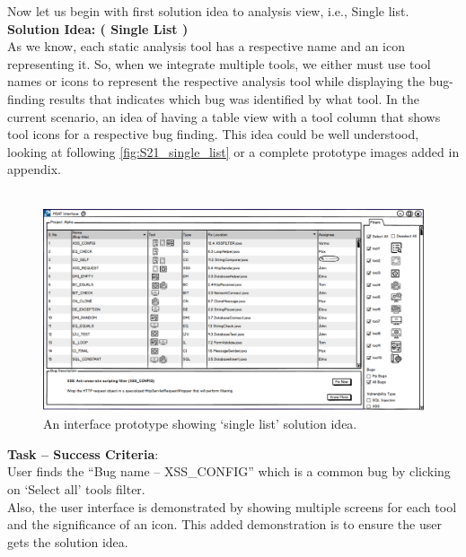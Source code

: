 Now let us begin with first solution idea to analysis view, i.e., Single list. \\

\textbf{Solution Idea: ( Single List )} \\

As we know, each static analysis tool has a respective name and an icon representing it. So, when we integrate multiple tools, we either must use tool names or icons to represent the respective analysis tool while displaying the bug-finding results that indicates which bug was identified by what tool. In the current scenario, an idea of having a table view with a tool column that shows tool icons for a respective bug finding. This idea could be well understood, looking at following  \autoref{fig:S21_single_list} or a complete prototype images added in appendix. \\ \\


\begin{figure}[hbt!]
	\centering
	\includegraphics[width=\linewidth]{figures/solution_ideas_snaps/S21_single_list}
	\caption{An interface prototype showing ‘single list’ solution idea.}
	\label{fig:S21_single_list}
\end{figure} 

\textbf{Task – Success Criteria}: \\

User finds the “Bug name – XSS\_CONFIG” which is a common bug by clicking on ‘Select all’ tools filter. \\

Also, the user interface is demonstrated by showing multiple screens for each tool and the significance of an icon. This added demonstration is to ensure the user gets the solution idea. \\ \\

